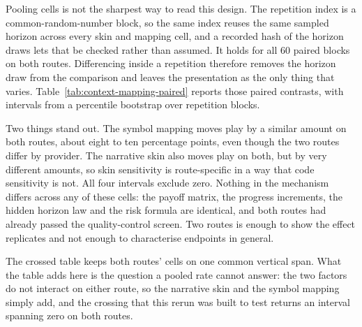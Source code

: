 \documentclass{article}
\begin{document}
Pooling cells is not the sharpest way to read this design. The repetition index
is a common-random-number block, so the same index reuses the same sampled
horizon across every skin and mapping cell, and a recorded hash of the horizon
draws lets that be checked rather than assumed. It
holds for all 60 paired blocks on both routes. Differencing inside a
repetition therefore removes the horizon draw from the comparison and leaves
the presentation as the only thing that varies.
Table~\ref{tab:context-mapping-paired} reports those paired contrasts, with
intervals from a percentile bootstrap over repetition blocks.

Two things stand out. The symbol mapping moves play by a similar amount on both
routes, about eight to ten percentage points, even though the two routes differ
by provider. The narrative skin
also moves play on both, but by very different amounts, so skin sensitivity is
route-specific in a way that code sensitivity is not. All four intervals
exclude zero. Nothing in the mechanism differs across any of these cells: the
payoff matrix, the progress increments, the hidden horizon law and the risk
formula are identical, and both routes had already passed the quality-control
screen. Two routes is enough to show the effect replicates and not enough to
characterise endpoints in general.

The crossed table keeps both routes' cells on one common vertical span. What the
table adds here is the question a pooled rate cannot answer:
the two factors do not interact on either route, so the narrative skin and the
symbol mapping simply add, and the crossing that this rerun was built to test
returns an interval spanning zero on both routes.
\end{document}
